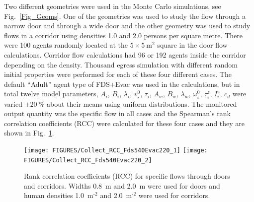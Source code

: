 \documentclass[12pt,a4paper,final,twoside]{stylevk}
\begin{document}
Two different geometries were used in the Monte Carlo simulations, see
Fig.~\ref{Fig_Geoms}. One of the geometries was used to study the
flow through a narrow door and through a wide door and the other
geometry was used to study flows in a corridor using densities 1.0 and
2.0 persons per square metre.  There were 100 agents randomly located
at the $5 \times 5 ~\mathrm{ \textrm{m}^\textrm{2} } $ square in the
door flow calculations.  Corridor flow calculations had 96 or 192
agents inside the corridor depending on the density.  Thousand egress
simulation with different random initial properties were performed for
each of these four different cases.  The default ``Adult'' agent type
of FDS+Evac was used in the calculations, but in total twelve model
parameters, $A_i$, $B_i$, $\lambda_i$, $v^0_i$, $\tau_i$, $A_w$,
$B_w$, $\lambda_w$, $\omega^0_i$, $\tau^z_i$, $I^z_{i}$, $c_d$ were
varied $\pm 20~\%$ about their means using uniform distributions.  The
monitored output quantity was the specific flow in all cases and the
Spearman's rank correlation coefficients (RCC) were calculated for
these four cases and they are shown in Fig.~\ref{Fig_RCC}.

%
\begin{figure}[!tb]
  \centerline{\texttt{[image: FIGURES/Collect\_RCC\_Fds540Evac220\_1]}  
      \texttt{[image: FIGURES/Collect\_RCC\_Fds540Evac220\_2]} } 
  \caption{Rank correlation coefficients (RCC) for specific flows
    through doors and corridors. Widths 0.8~m and 2.0~m were used for
    doors and human densities 1.0~$\mathrm{ \textrm{m}^\textrm{-2} } $
    and 2.0~$\mathrm{ \textrm{m}^\textrm{-2} } $ were used for
    corridors.\protect\hspace{200mm}}\label{Fig_RCC}
\end{figure}
%
\end{document}

